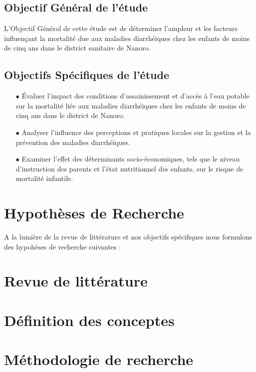 \documentclass[12pt,a4paper]{report}
\begin{document}
			\subsection{Objectif Général de l'étude}
			L’Objectif Général de cette étude est de déterminer l'ampleur et les facteurs influençant la mortalité due aux maladies diarrhéiques chez les enfants de moins de cinq ans dans le district sanitaire de Nanoro.
			
			\subsection{Objectifs Spécifiques de l'étude}
			\begin{itemize}
				\item[$\bullet$] Évaluer l'impact des conditions d'assainissement et d'accès à l'eau potable sur la mortalité liée aux maladies diarrhéiques chez les enfants de moins de cinq ans dans le district de Nanoro.
				
				\item[$\bullet$] Analyser l'influence des perceptions et pratiques locales sur la gestion et la prévention des maladies diarrhéiques.
				
				\item[$\bullet$] Examiner l'effet des déterminants socio-économiques, tels que le niveau d'instruction des parents et l'état nutritionnel des enfants, sur le risque de mortalité infantile.
			\end{itemize}
				
					
			\section{Hypothèses de Recherche}
				A la lumière de la revue de littérature et nos objectifs spécifiques nous formulons des hypohèses de recherche suivantes :
				
			\section{Revue de littérature}
				
		
			
		\section{Définition des conceptes}
			
				
		\section{Méthodologie de recherche}
\end{document}
